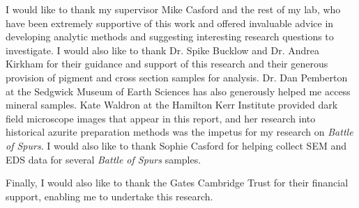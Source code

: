 
\begin{acknowledgements}      


I would like to thank my supervisor Mike Casford and the rest of my lab, who have been extremely supportive of this work and offered invaluable advice in developing analytic methods and suggesting interesting research questions to investigate. I would also like to thank Dr. Spike Bucklow and Dr. Andrea Kirkham for their guidance and support of this research and their generous provision of pigment and cross section samples for analysis. Dr. Dan Pemberton at the Sedgwick Museum of Earth Sciences has also generously helped me access mineral samples. Kate Waldron at the Hamilton Kerr Institute provided dark field microscope images that appear in this report, and her research into historical azurite preparation methods was the impetus for my research on \textit{Battle of Spurs}. I would also like to thank Sophie Casford for helping collect SEM and EDS data for several \textit{Battle of Spurs} samples.

Finally, I would also like to thank the Gates Cambridge Trust for their financial support, enabling me to undertake this research.

\end{acknowledgements}
